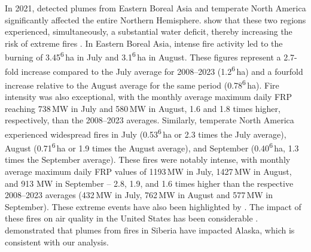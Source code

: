 \documentclass[acp, manuscript]{copernicus}
\begin{document}
In 2021, detected plumes from Eastern Boreal Asia and temperate North America significantly affected the entire Northern Hemisphere. \citep{hayasakaRareExtremeWildland2021,tomshinFeaturesExtremeFire2022,zhengRecordhighCO2Emissions2023} show that these two regions experienced, simultaneously, a substantial water deficit, thereby increasing the risk of extreme fires .
In Eastern Boreal Asia, intense fire activity led to the burning of 3.45\textsuperscript{6}\,ha in July and 3.1\textsuperscript{6}\,ha in August. These figures represent a 2.7-fold increase compared to the July average for 2008--2023 (1.2\textsuperscript{6}\,ha) and a fourfold increase relative to the August average for the same period (0.78\textsuperscript{6}\,ha). Fire intensity was also exceptional, with the monthly average maximum daily FRP reaching 738\,MW in July and 580\,MW in August, 1.6 and 1.8 times higher, respectively, than the 2008--2023 averages.
Similarly, temperate North America experienced widespread fires in July (0.53\textsuperscript{6}\,ha or 2.3 times the July average), August (0.71\textsuperscript{6}\,ha or 1.9 times the August average), and September (0.40\textsuperscript{6}\,ha, 1.3 times the September average). These fires were notably intense, with monthly average maximum daily FRP values of 1193\,MW in July, 1427\,MW in August, and 913 MW in September -- 2.8, 1.9, and 1.6 times higher than the respective 2008--2023 averages (432\,MW in July, 762\,MW in August and 577\,MW in September). These extreme events have also been highlighted by \citet{cunninghamIncreasingFrequencyIntensity2024}.
The impact of these fires on air quality in the United States has been considerable \citep{burkeContributionWildfirePM252023}. \citet{tomshinFeaturesExtremeFire2022} demonstrated that plumes from fires in Siberia have impacted Alaska, which is consistent with our analysis.

\end{document}
